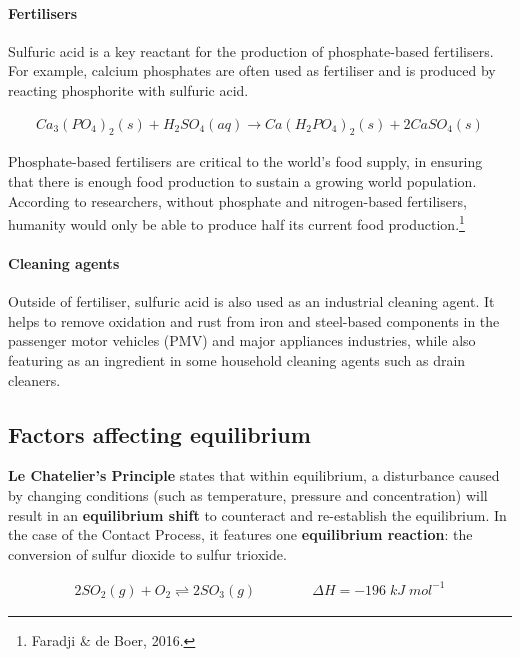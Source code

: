 \documentclass[12pt, a4paper]{article}
\begin{document}
\paragraph{Fertilisers}
Sulfuric acid is a key reactant for the production of phosphate-based fertilisers. For example, calcium phosphates are often used as fertiliser and is produced by reacting phosphorite with sulfuric acid.

\begin{align}
	Ca_{3}(PO_{4})_{2}(s) + H_{2}SO_{4}(aq) \rightarrow Ca(H_{2}PO_{4})_{2}(s) + 2CaSO_{4}(s)
\end{align}

Phosphate-based fertilisers are critical to the world's food supply, in ensuring that there is enough food production to sustain a growing world population. According to researchers, without phosphate and nitrogen-based fertilisers, humanity would only be able to produce half its current food production.\footnote{Faradji \& de Boer, 2016.}

\paragraph{Cleaning agents}
Outside of fertiliser, sulfuric acid is also used as an industrial cleaning agent. It helps to remove oxidation and rust from iron and steel-based components in the passenger motor vehicles (PMV) and major appliances industries, while also featuring as an ingredient in some household cleaning agents such as drain cleaners.






\subsection{Factors affecting equilibrium}

\textbf{Le Chatelier's Principle} states that within equilibrium, a disturbance caused by changing conditions (such as temperature, pressure and concentration) will result in an \textbf{equilibrium shift} to counteract and re-establish the equilibrium. In the case of the Contact Process, it features one \textbf{equilibrium reaction}: the conversion of sulfur dioxide to sulfur trioxide.

\begin{align}
	2SO_{2}(g) + O_{2} \rightleftharpoons 2SO_{3}(g) \qquad \qquad \Delta H = -196 \; kJ \; mol^{-1}
\end{align}
\end{document}
